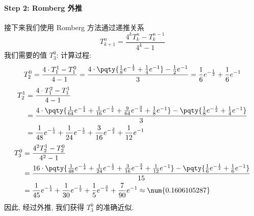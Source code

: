 \documentclass[lang = zh]{iwork}
\begin{document}
\begin{sol}
  \paragraph{Step 2: Romberg 外推}
  接下来我们使用 Romberg 方法通过递推关系
  \begin{equation*}
    T_{k + 1}^n = \frac{4^k T_k^n - T_k^{n - 1}}{4^k - 1}
  \end{equation*}
  我们需要的值 $T_3^0$:
  计算过程:
  \begin{equation*}
    T_2^0
    = \frac{4 \cdot T_1^1 - T_1^0}{4 - 1}
    = \frac{4 \cdot \pqty{\frac{1}{8} e^{-\frac{1}{2}} + \frac{1}{4} e^{-1}} - \frac{1}{2} e^{-1}}{3}
    = \frac{1}{6} e^{-\frac{1}{2}} + \frac{1}{6} e^{-1}
  \end{equation*}
  \begin{equation*}
    \begin{split}
      T_2^1
       & = \frac{4 \cdot T_1^2 - T_1^1}{4 - 1}                                                                                                                                                                    \\
       & = \frac{4 \cdot \pqty{\frac{1}{64} e^{-\frac{1}{4}} + \frac{1}{16} e^{-\frac{1}{2}} + \frac{9}{64} e^{-\frac{3}{4}} + \frac{1}{8} e^{-1}} - \pqty{\frac{1}{8} e^{-\frac{1}{2}} + \frac{1}{4} e^{-1}}}{3} \\
       & = \frac{1}{48} e^{-\frac{1}{4}} + \frac{1}{24} e^{-\frac{1}{2}} + \frac{3}{16} e^{-\frac{3}{4}} + \frac{1}{12} e^{-1}
    \end{split}
  \end{equation*}
  \begin{equation*}
    \begin{split}
      T_3^0
       & = \frac{4^2 T_2^1 - T_2^0}{4^2 - 1}                                                                                                                                                                         \\
       & = \frac{16 \cdot \pqty{\frac{1}{48} e^{-\frac{1}{4}} + \frac{1}{24} e^{-\frac{1}{2}} + \frac{3}{16} e^{-\frac{3}{4}} + \frac{1}{12} e^{-1}} - \pqty{\frac{1}{6} e^{-\frac{1}{2}} + \frac{1}{6} e^{-1}}}{15} \\
       & = \frac{1}{45} e^{-\frac{1}{4}} + \frac{1}{30} e^{-\frac{1}{2}} + \frac{1}{5} e^{-\frac{3}{4}} + \frac{7}{90} e^{-1}
      \approx \num{0.1606105287}
    \end{split}
  \end{equation*}
  因此, 经过外推, 我们获得 $T_3^0$ 的准确近似.
\end{sol}
\end{document}
